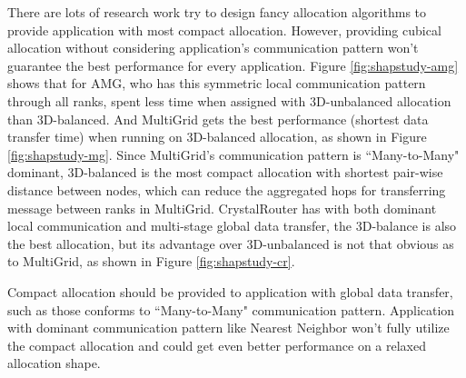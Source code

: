 \documentclass[conference]{IEEEtran}
\begin{document}
There are lots of research work try to design fancy allocation algorithms to provide application with most compact allocation. However, providing cubical allocation without considering application's communication pattern won't guarantee the best performance for every application. Figure \ref{fig:shapstudy-amg} shows that for AMG, who has this symmetric local communication pattern through all ranks, spent less time when assigned with 3D-unbalanced allocation than 3D-balanced. And MultiGrid gets the best performance (shortest data transfer time) when running on 3D-balanced allocation, as shown in Figure \ref{fig:shapstudy-mg}. Since MultiGrid's communication pattern is ``Many-to-Many" dominant, 3D-balanced is the most compact allocation with shortest pair-wise distance between nodes, which can reduce the aggregated hops for transferring message between ranks in MultiGrid. CrystalRouter has with both dominant local communication and multi-stage global data transfer, the 3D-balance is also the best allocation, but its advantage over 3D-unbalanced is not that obvious as to MultiGrid, as shown in Figure \ref{fig:shapstudy-cr}.

Compact allocation should be provided to application with global data transfer, such as those conforms to ``Many-to-Many" communication pattern. Application with dominant communication pattern like Nearest Neighbor won't fully utilize the compact allocation and could get even better performance on a relaxed allocation shape. 
\end{document}
